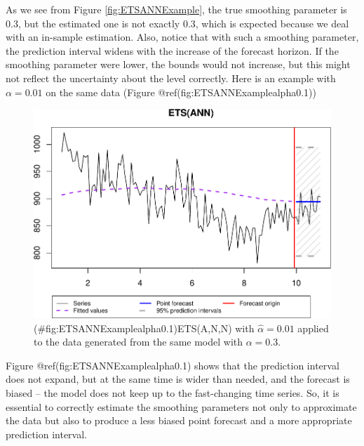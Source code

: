 \documentclass[
]{book}
\newenvironment{Shaded}{\begin{snugshade}}{\end{snugshade}}
\newcommand{\AttributeTok}[1]{\textcolor[rgb]{0.77,0.63,0.00}{#1}}
\newcommand{\ConstantTok}[1]{\textcolor[rgb]{0.00,0.00,0.00}{#1}}
\newcommand{\DecValTok}[1]{\textcolor[rgb]{0.00,0.00,0.81}{#1}}
\newcommand{\FloatTok}[1]{\textcolor[rgb]{0.00,0.00,0.81}{#1}}
\newcommand{\FunctionTok}[1]{\textcolor[rgb]{0.00,0.00,0.00}{#1}}
\newcommand{\NormalTok}[1]{#1}
\newcommand{\OtherTok}[1]{\textcolor[rgb]{0.56,0.35,0.01}{#1}}
\newcommand{\SpecialCharTok}[1]{\textcolor[rgb]{0.00,0.00,0.00}{#1}}
\newcommand{\StringTok}[1]{\textcolor[rgb]{0.31,0.60,0.02}{#1}}
\theoremstyle{definition}
\theoremstyle{definition}
\theoremstyle{definition}
\theoremstyle{definition}
\theoremstyle{remark}
\begin{document}
As we see from Figure \ref{fig:ETSANNExample}, the true smoothing parameter is 0.3, but the estimated one is not exactly 0.3, which is expected because we deal with an in-sample estimation. Also, notice that with such a smoothing parameter, the prediction interval widens with the increase of the forecast horizon. If the smoothing parameter were lower, the bounds would not increase, but this might not reflect the uncertainty about the level correctly. Here is an example with \(\alpha=0.01\) on the same data (Figure @ref(fig:ETSANNExamplealpha0.1))

\begin{Shaded}
\end{Shaded}

\begin{figure}
\centering
\includegraphics{Svetunkov--2022----ADAM_files/figure-latex/ETSANNExamplealpha0.1-1.pdf}
\caption{(\#fig:ETSANNExamplealpha0.1)ETS(A,N,N) with \(\hat{\alpha}=0.01\) applied to the data generated from the same model with \(\alpha=0.3\).}
\end{figure}

Figure @ref(fig:ETSANNExamplealpha0.1) shows that the prediction interval does not expand, but at the same time is wider than needed, and the forecast is biased -- the model does not keep up to the fast-changing time series. So, it is essential to correctly estimate the smoothing parameters not only to approximate the data but also to produce a less biased point forecast and a more appropriate prediction interval.
\end{document}
